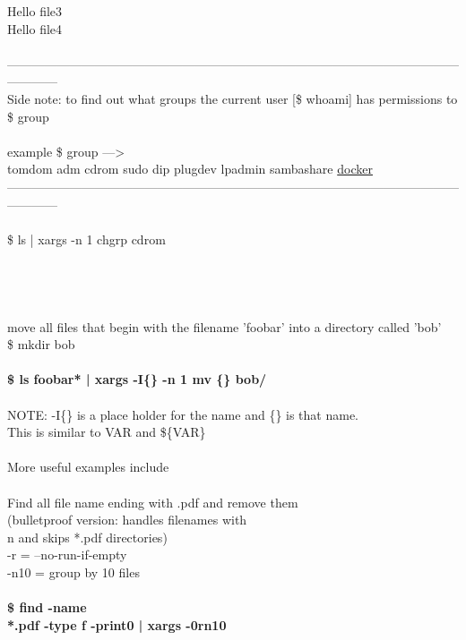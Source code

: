 \documentclass[10pt,a4paper]{article}
\begin{document}
{Hello file3\\
Hello file4}{\Large \\
\\
------------------------------------------------------------------------------------------------------------------------\\
Side note: to find out what groups the current user [\$ whoami] has permissions to\\
\$ group\\
\\
example \$ group --->\\
tomdom adm cdrom sudo dip plugdev lpadmin sambashare \hyperlink{docker}{docker}}{\Large \\
------------------------------------------------------------------------------------------------------------------------\\
\\
\$ ls | xargs -n 1 chgrp cdrom\\
\\
[ go through each file in the current directory and changr the group ownership for each to 'cdrom']\\
\\
\\
move all files that begin with the filename 'foobar' into a directory called 'bob'\\
\$ mkdir bob\\
\\
\textbf{\$ ls foobar*  | xargs -I\{\} -n 1 mv \{\} bob/}}{\Large \\
\\
NOTE: -I\{\}   is a place holder for the name and \{\} is that name.\\
This is similar to VAR  and \$\{VAR\}\\
\\
More useful examples include\\
\\
Find all file name ending with .pdf and remove them\\
(bulletproof version: handles filenames with \\n and skips *.pdf directories)\\
-r = --no-run-if-empty\\
 -n10 = group by 10 files\\
\\
\textbf{\$ find -name \\*.pdf -type f -print0 | xargs -0rn10}}{\Large \\
\\
}
\end{document}
